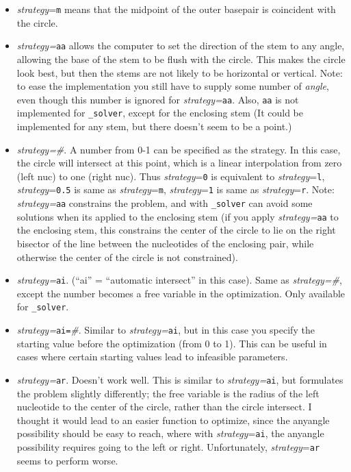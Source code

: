 \documentclass[letterpaper,12pt]{report}
\begin{document}
\begin{itemize}
\begin{itemize}
\item
\textit{strategy}={\tt m} means that the midpoint of the outer basepair is
coincident with the circle.

\item
\textit{strategy=}{\tt aa} allows the computer to set the direction of the
stem to any angle, allowing the base of the stem to be flush with the
circle.  This makes the circle look best, but then the stems are not
likely to be horizontal or vertical.  Note: to ease the implementation you
still have to supply some number of \textit{angle}, even though this
number is ignored for \textit{strategy=}{\tt aa}.  Also, {\tt aa} is not
implemented for {\tt \_solver}, except for the enclosing stem (It could be
implemented for any stem, but there doesn{\textquoteright}t seem to be
a point.)

\item
\textit{strategy=\#}.  A number from 0-1 can be specified as the
strategy.  In this case, the circle will intersect at this point, which
is a linear interpolation from zero (left nuc) to one (right nuc). 
Thus  {\it strategy}={\tt 0} is equivalent to {\it strategy}={\tt l}, {\it strategy}={\tt 0.5} is same as
{\it strategy}={\tt m}, {\it strategy}={\tt 1} is same as {\it strategy}={\tt r}.  Note:
\textit{strategy=}{\tt aa} constrains the problem, and with {\tt \_solver} can
avoid some solutions when its applied to the enclosing stem (if you
apply \textit{strategy=}{\tt aa} to the enclosing stem, this constrains the
center of the circle to lie on the right bisector of the line between
the nucleotides of the enclosing pair, while otherwise the center of
the circle is not constrained).

\item
\textit{strategy=}{\tt ai}.  ({\textquotedblleft}ai{\textquotedblright} =
{\textquotedblleft}automatic intersect{\textquotedblright} in this
case).  Same as \textit{strategy=\#}, except the number becomes a free
variable in the optimization.  Only available for {\tt \_solver}.

\item
\textit{strategy=}{\tt ai=}\textit{\#}.  Similar to \textit{strategy=}{\tt ai}, but
in this case you specify the starting value before the optimization
(from 0 to 1).  This can be useful in cases where certain starting
values lead to infeasible parameters.

\item
\textit{strategy=}{\tt ar}.  Doesn{\textquoteright}t work well.  This is
similar to \textit{strategy=}{\tt ai}, but formulates the problem slightly
differently; the free variable is the radius of the left nucleotide to
the center of the circle, rather than the circle intersect.  I thought
it would lead to an easier function to optimize, since the anyangle
possibility should be easy to reach, where with {\it strategy}={\tt ai}, the
anyangle possibility requires going to the left or right. 
Unfortunately, {\it strategy}={\tt ar} seems to perform worse.
\end{itemize}


\end{itemize}
\end{document}
